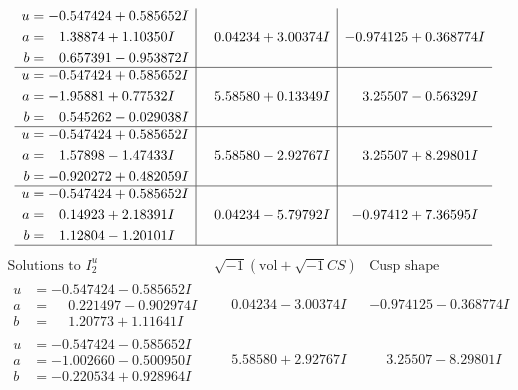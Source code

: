 \documentclass[1p]{elsarticle_modified}
\theoremstyle{definition}
\newcommand{\I}{\sqrt{-1}}
\begin{document}
$$\begin{array}{c|c|c}
\begin{aligned}
u &= -0.547424 + 0.585652 I \\
a &= \phantom{-}1.38874 + 1.10350 I \\
b &= \phantom{-}0.657391 - 0.953872 I\end{aligned}
 & \phantom{-}0.04234 + 3.00374 I & -0.974125 + 0.368774 I \\ \hline\begin{aligned}
u &= -0.547424 + 0.585652 I \\
a &= -1.95881 + 0.77532 I \\
b &= \phantom{-}0.545262 - 0.029038 I\end{aligned}
 & \phantom{-}5.58580 + 0.13349 I & \phantom{-}3.25507 - 0.56329 I \\ \hline\begin{aligned}
u &= -0.547424 + 0.585652 I \\
a &= \phantom{-}1.57898 - 1.47433 I \\
b &= -0.920272 + 0.482059 I\end{aligned}
 & \phantom{-}5.58580 - 2.92767 I & \phantom{-}3.25507 + 8.29801 I \\ \hline\begin{aligned}
u &= -0.547424 + 0.585652 I \\
a &= \phantom{-}0.14923 + 2.18391 I \\
b &= \phantom{-}1.12804 - 1.20101 I\end{aligned}
 & \phantom{-}0.04234 - 5.79792 I & -0.97412 + 7.36595 I\\
 \hline 
 \end{array}$$\newpage$$\begin{array}{c|c|c}  
\text{Solutions to }I^u_{2}& \I (\text{vol} + \sqrt{-1}CS) & \text{Cusp shape}\\
 \hline 
\begin{aligned}
u &= -0.547424 - 0.585652 I \\
a &= \phantom{-}0.221497 - 0.902974 I \\
b &= \phantom{-}1.20773 + 1.11641 I\end{aligned}
 & \phantom{-}0.04234 - 3.00374 I & -0.974125 - 0.368774 I \\ \hline\begin{aligned}
u &= -0.547424 - 0.585652 I \\
a &= -1.002660 - 0.500950 I \\
b &= -0.220534 + 0.928964 I\end{aligned}
 & \phantom{-}5.58580 + 2.92767 I & \phantom{-}3.25507 - 8.29801 I \\ \hline\begin{aligned}

\end{aligned}
\end{array}$$
\end{document}
